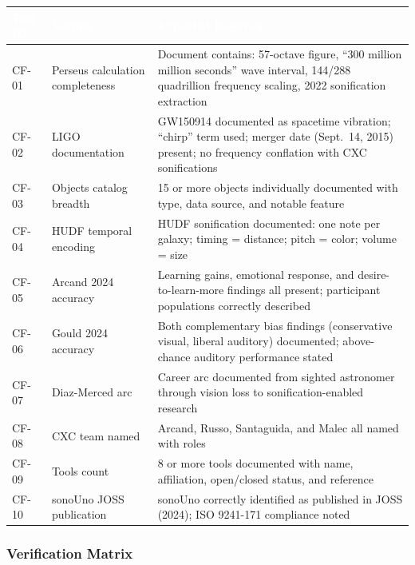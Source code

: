 \documentclass[11pt,letterpaper]{article}
\newcommand{\tableheader}[1]{\textbf{\sffamily\textcolor{white}{#1}}}
\begin{document}
\begin{center}
\begin{tabularx}{\textwidth}{C{1.5cm}L{4cm}X}
\toprule
{}
\tableheader{Test ID} & \tableheader{Verifies} & \tableheader{Expected Behavior} \\
\midrule
CF-01 & Perseus calculation completeness & Document contains: 57-octave figure, ``300 million million seconds'' wave interval, 144/288 quadrillion frequency scaling, 2022 sonification extraction \\
CF-02 & LIGO documentation & GW150914 documented as spacetime vibration; ``chirp'' term used; merger date (Sept.\ 14, 2015) present; no frequency conflation with CXC sonifications \\
CF-03 & Objects catalog breadth & 15 or more objects individually documented with type, data source, and notable feature \\
CF-04 & HUDF temporal encoding & HUDF sonification documented: one note per galaxy; timing = distance; pitch = color; volume = size \\
CF-05 & Arcand 2024 accuracy & Learning gains, emotional response, and desire-to-learn-more findings all present; participant populations correctly described \\
CF-06 & Gould 2024 accuracy & Both complementary bias findings (conservative visual, liberal auditory) documented; above-chance auditory performance stated \\
CF-07 & Diaz-Merced arc & Career arc documented from sighted astronomer through vision loss to sonification-enabled research \\
CF-08 & CXC team named & Arcand, Russo, Santaguida, and Malec all named with roles \\
CF-09 & Tools count & 8 or more tools documented with name, affiliation, open/closed status, and reference \\
CF-10 & sonoUno JOSS publication & sonoUno correctly identified as published in JOSS (2024); ISO 9241-171 compliance noted \\
\bottomrule
\end{tabularx}
\end{center}

\subsubsection{Verification Matrix}
\end{document}
